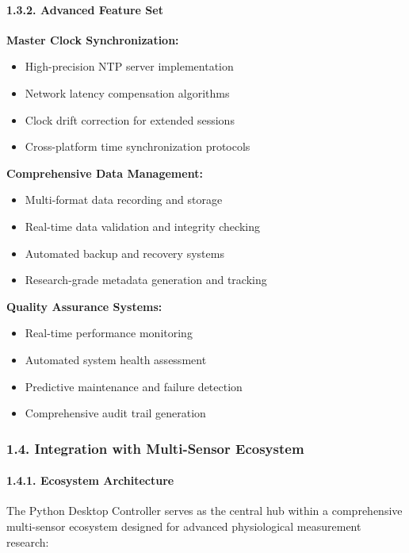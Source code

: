 \documentclass[11pt,a4paper]{article}
\begin{document}
\paragraph{1.3.2. Advanced Feature Set}

\textbf{Master Clock Synchronization:}

\begin{itemize}
\item High-precision NTP server implementation
\item Network latency compensation algorithms
\item Clock drift correction for extended sessions
\item Cross-platform time synchronization protocols

\end{itemize}
\textbf{Comprehensive Data Management:}

\begin{itemize}
\item Multi-format data recording and storage
\item Real-time data validation and integrity checking
\item Automated backup and recovery systems
\item Research-grade metadata generation and tracking

\end{itemize}
\textbf{Quality Assurance Systems:}

\begin{itemize}
\item Real-time performance monitoring
\item Automated system health assessment
\item Predictive maintenance and failure detection
\item Comprehensive audit trail generation

\end{itemize}
\subsubsection{1.4. Integration with Multi-Sensor Ecosystem}

\paragraph{1.4.1. Ecosystem Architecture}

The Python Desktop Controller serves as the central hub within a comprehensive multi-sensor ecosystem designed for
advanced physiological measurement research:
\end{document}
